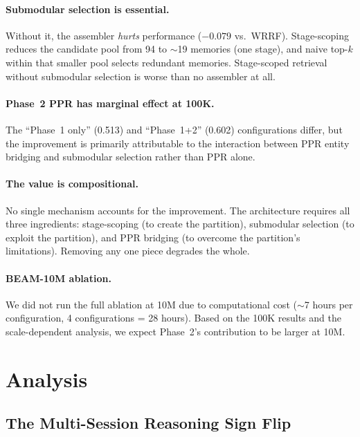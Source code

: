\documentclass[11pt]{article}
\begin{document}
\paragraph{Submodular selection is essential.}
Without it, the assembler \emph{hurts} performance ($-0.079$ vs.\
WRRF).  Stage-scoping reduces the candidate pool from 94 to $\sim$19
memories (one stage), and naive top-$k$ within that smaller pool
selects redundant memories.  Stage-scoped retrieval without submodular
selection is worse than no assembler at all.

\paragraph{Phase~2 PPR has marginal effect at 100K.}
The ``Phase~1 only'' (0.513) and ``Phase~1+2'' (0.602) configurations
differ, but the improvement is primarily attributable to the
interaction between PPR entity bridging and submodular selection
rather than PPR alone.

\paragraph{The value is compositional.}
No single mechanism accounts for the improvement.  The architecture
requires all three ingredients: stage-scoping (to create the
partition), submodular selection (to exploit the partition), and PPR
bridging (to overcome the partition's limitations).  Removing any one
piece degrades the whole.

\paragraph{BEAM-10M ablation.}
We did not run the full ablation at 10M due to computational cost
($\sim$7 hours per configuration, 4 configurations = 28 hours).
Based on the 100K results and the scale-dependent analysis, we expect
Phase~2's contribution to be larger at 10M.

\section{Analysis}
\label{sec:analysis}

\subsection{The Multi-Session Reasoning Sign Flip}
\label{sec:sign-flip}
\end{document}
